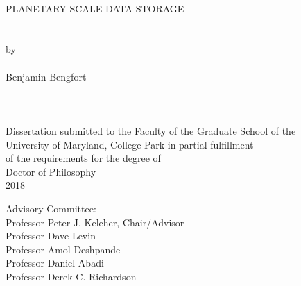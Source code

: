 
\thispagestyle{empty}
\hbox{\ }
\vspace{1in}
\renewcommand{\baselinestretch}{1}
\small\normalsize
\begin{center}

\large{{PLANETARY SCALE DATA STORAGE}}\\
\ \\
\ \\
\large{by} \\
\ \\
\large{Benjamin Bengfort}%
\ \\
\ \\
\ \\
\ \\
\normalsize
Dissertation submitted to the Faculty of the Graduate School of the \\
University of Maryland, College Park in partial fulfillment \\
of the requirements for the degree of \\
Doctor of Philosophy \\
2018
\end{center}

\vspace{7.5em}

\noindent Advisory Committee: \\
Professor Peter J. Keleher, Chair/Advisor \\
Professor Dave Levin \\
Professor Amol Deshpande \\
Professor Daniel Abadi \\
Professor Derek C. Richardson
